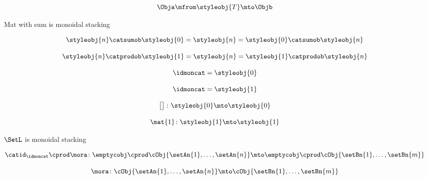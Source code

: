 {\begin{forslides}
        \begin{equation}
            \label{eq:parallelism-059}
            \Obja \mfrom \styleobj{T} \mto \Objb
        \end{equation}

        Mat with sum is monoidal stacking

        \begin{equation}
            \label{eq:parallelism-060}
            \styleobj{n} \catsumob \styleobj{0} = \styleobj{n} = \styleobj{0} \catsumob \styleobj{n}
        \end{equation}

        \begin{equation}
            \label{eq:parallelism-061}
            \styleobj{n} \catprodob \styleobj{1} = \styleobj{n} = \styleobj{1} \catprodob \styleobj{n}
        \end{equation}

        \begin{equation}
            \label{eq:parallelism-062}
            \idmoncat = \styleobj{0}
        \end{equation}

        \begin{equation}
            \label{eq:parallelism-063}
            \idmoncat = \styleobj{1}
        \end{equation}

        \begin{equation}
            \label{eq:parallelism-064}
            \begin{bmatrix}\\ \end{bmatrix} \colon \styleobj{0} \mto \styleobj{0}
        \end{equation}

        \begin{equation}
            \label{eq:parallelism-065}
            \mat{ 1 } \colon \styleobj{1} \mto \styleobj{1}
        \end{equation}

        $\SetL$ is monoidal stacking

        \begin{equation}
            \label{eq:parallelism-066}
            \catid_\idmoncat \cprod \mora \colon \emptycobj \cprod \cObj{\setAn{1}, \ldots, \setAn{n}} \mto \emptycobj \cprod \cObj{\setBn{1}, \ldots, \setBn{m}}
        \end{equation}

        \begin{equation}
            \label{eq:parallelism-067}
            \mora \colon \cObj{\setAn{1}, \ldots, \setAn{n}} \mto \cObj{\setBn{1}, \ldots, \setBn{m}}
        \end{equation}


\end{forslides}}
